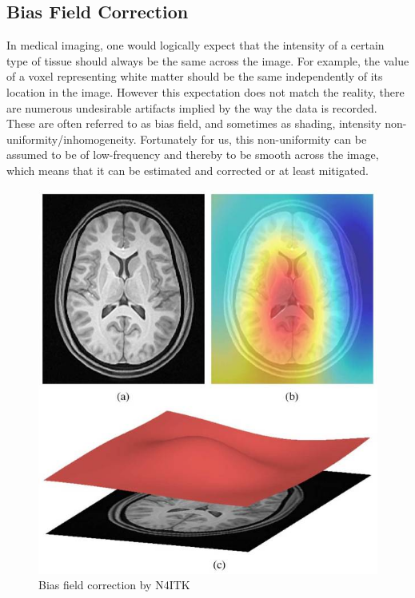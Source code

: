 \subsection{Bias Field Correction}
In medical imaging, one would logically expect that the intensity of a certain type of tissue should always be the same across the image. For example, the value of a voxel representing white matter should be the same independently of its location in the image. However this expectation does not match the reality, there are numerous undesirable artifacts implied by the way the data is recorded. These are often referred to as bias field, and sometimes as shading, intensity non-uniformity/inhomogeneity.  Fortunately for us, this non-uniformity can be assumed to be of low-frequency and thereby to be smooth across the image, which means that it can be estimated and corrected or at least mitigated.
\begin{figure}
 \centering
 \includegraphics[width=.9\linewidth]{figures/preprocessing/N4_explain.jpeg}
 \captionsetup{width=.9\linewidth}
 \caption[N4]{Bias field correction by N4ITK\footnotemark}
 \label{fig:N4_explain}
\end{figure}

